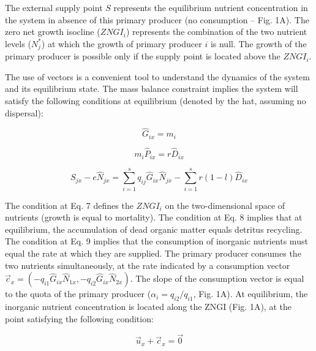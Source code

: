 \documentclass[letterpaper,twocolumn,showkeys]{revtex4-1}
\begin{document}
The external supply point $S$ represents the equilibrium nutrient concentration in the system in absence of this primary producer (no consumption – Fig. 1A). The zero net growth isocline ($ZNGI_i$) represents the combination of the two nutrient levels ($N_{j}^*$) at which the growth of primary producer $i$ is null. The growth of the primary producer is possible only if the supply point is located above the $ZNGI_i$. 

The use of vectors is a convenient tool to understand the dynamics of the system and its equilibrium state. The mass balance constraint implies the system will satisfy the following conditions at equilibrium (denoted by the hat, assuming no dispersal):

\begin{equation}
	\label{e:bnet}
	\widehat{G} _{ix}= m_{i} 
\end{equation}

\begin{equation}
	\label{e:bnet}
	m_{i}\widehat{P}_{ix}=r\widehat{D}_{ix} 
\end{equation}

\begin{equation}
	\label{e:bnet}
	S_{jx}-e\widehat{N}_{jx}=\sum_{i=1}^{s}q_{ij}\widehat{G}_{ix}\widehat{N}_{jx}-\sum_{i=1}^{s}r(1-l)\widehat{D}_{ix}
\end{equation}

The condition at Eq. 7 defines the $ZNGI_i$ on the two-dimensional space of nutrients (growth is equal to mortality). The condition at Eq. 8 implies that at equilibrium, the accumulation of dead organic matter equals detritus recycling. The condition at Eq. 9 implies that the consumption of inorganic nutrients must equal the rate at which they are supplied. The primary producer consumes the two nutrients simultaneously, at the rate indicated by a consumption vector $\overrightarrow{c}_{x} = (-q_{i1}\widehat{G}_{ix}\widehat{N}_{1x},-q_{i2}\widehat{G}_{ix}\widehat{N}_{2x})$. The slope of the consumption vector is equal to the quota of the primary producer ($\alpha_{i}=q_{i2}/q_{i1}$, Fig. 1A). At equilibrium, the inorganic nutrient concentration is located along the ZNGI (Fig. 1A), at the point satisfying the following condition:

\begin{equation}
	\label{e:bnet}
	\overrightarrow{u}_{x}+\overrightarrow{c}_{x}=\overrightarrow{0}
\end{equation}		 	
\end{document}
